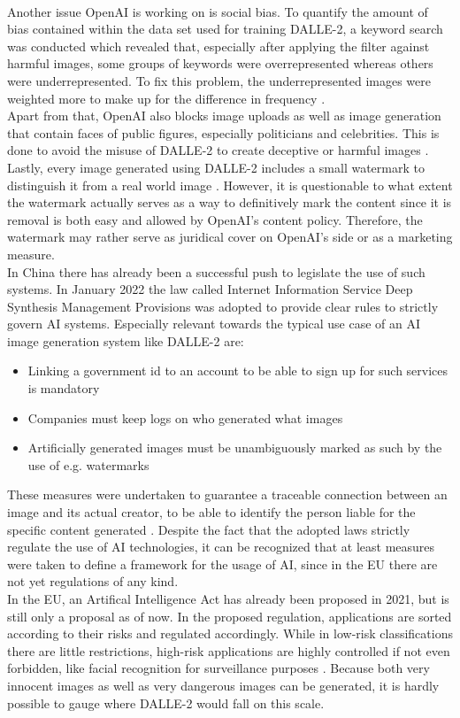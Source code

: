 \documentclass[10pt,twocolumn,twoside]{osajnl}
\begin{document}
\\
Another issue OpenAI is working on is social bias. To quantify the amount of bias contained within the data set used for training DALLE-2, a keyword search was conducted 
which revealed that, especially after applying the filter against harmful images, some groups of keywords were overrepresented whereas others were underrepresented. 
To fix this problem, the underrepresented images were weighted more to make up for the difference in frequency \cite{openaifilters}. 
\\
Apart from that, OpenAI also blocks image uploads as well as image generation that contain faces of public figures, especially politicians and celebrities. 
This is done to avoid the misuse of DALLE-2 to create deceptive or harmful images \cite{openaiimage}. 
\\
Lastly, every image generated using DALLE-2 includes a small watermark to distinguish it from a real world image \cite{openaicp}. 
However, it is questionable to what extent the watermark actually serves as a way to definitively mark the content since it is removal is both easy and allowed by OpenAI's content policy.
Therefore, the watermark may rather serve as juridical cover on OpenAI's side or as a marketing measure.
\\
In China there has already been a successful push to legislate the use of such systems. In January 2022 the law called Internet Information Service Deep Synthesis Management Provisions was adopted to provide clear rules
to strictly govern AI systems. Especially relevant towards the typical use case of an AI image generation system like DALLE-2 are: 
\begin{itemize}
	\item Linking a government id to an account to be able to sign up for such services is mandatory
	\item Companies must keep logs on who generated what images
	\item Artificially generated images must be unambiguously marked as such by the use of e.g. watermarks 
\end{itemize}
These measures were undertaken to guarantee a traceable connection between an image and its actual creator, to be able to identify the person liable for the 
specific content generated \cite{CACGuidelines}. Despite the fact that the adopted laws strictly regulate the use of AI technologies, it can be recognized 
that at least measures were taken to define a framework for the usage of AI, since in the EU there are not yet regulations of any kind.
\\
In the EU, an Artifical Intelligence Act has already been proposed in 2021, but is still only a proposal as of now. 
In the proposed regulation, applications are sorted according to their risks and regulated accordingly. 
While in low-risk classifications there are little restrictions, high-risk applications are highly controlled if not even forbidden, like 
facial recognition for surveillance purposes \cite{EUAI}. 
Because both very innocent images as well as very dangerous images can be generated, it is hardly possible to gauge where DALLE-2 would fall on this scale.
\end{document}
